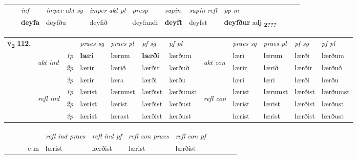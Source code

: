 \begin{tabular}{llllllllllll}
 & & \textit{inf} & \textit{imper akt sg} & \textit{imper akt pl}   & \textit{presp} & \textit{supin} & \textit{supin refl} & \textit{pp m}     \\*
  & & \textbf{deyfa} & deyfðu  & deyfið   & deyfandi &  \textbf{deyft} & deyfst & \textbf{deyfður} adj \textbf{\textsubscript{2???}} \\*
\cmidrule{1-12}
\end{tabular}



\begin{tabular}{llllllllllll} \toprule
\multirow{4}{*}{{{\textbf{v{\textsubscript{2}}} \Large{\textbf{112.}}}}}  & &   &  \textit{praes sg}  & \textit{praes pl}  &\textit{ pf sg} & \textit{pf pl} &  &  \textit{praes sg}  & \textit{praes pl}  & \textit{pf sg} & \textit{pf pl } \\*
	\cmidrule{4-7} \cmidrule{9-12}
 & \multirow{3}{*}{\begin{turn}{90}\textit{akt ind}\end{turn}} & {\textit{1p}} & \textbf{læri} & lærum    & \textbf{lærði} & lærðum & \multirow{3}{*}{\begin{turn}{90}\textit{akt con}\end{turn}} &læri & lærum & lærði & lærðum\\*
& &  {\textit{2p}} &  lærir  & lærið   & lærðir & lærðuð & & lærir & lærið & lærðir & lærðuð \\*
& &  {\textit{3p}} & lærir & læra   & lærði & lærðu & & læri & læri& lærði & lærðu  \\*
\cmidrule{4-7} \cmidrule{9-12}
 &\multirow{3}{*}{\begin{turn}{90}\textit{refl ind}\end{turn}} & {\textit{1p}} & lærist & lærumst    & lærðist & lærðumst & \multirow{3}{*}{\begin{turn}{90}\textit{refl con}\end{turn}}  &lærist & lærumst & lærðist & lærðumst\\*
 &&  {\textit{2p}} &  lærist  & lærist   & lærðist & lærðust & &lærist & lærist & lærðist & lærðust \\*
& &  {\textit{3p}} & lærist & lærast   & lærðist & lærðust & & lærist & lærist& lærðist & lærðust  \\*
\cmidrule{4-7} \cmidrule{9-12}
\end{tabular}


\begin{tabular}{llllllllllll}
 & &  & &  \textit{refl ind praes} & \textit{refl ind pf} & \textit{refl con praes} & \textit{refl con pf} \\*
&  & & e-m & lærist & lærðist & lærist & lærðist \\*
\cmidrule{5-9}
\end{tabular}


